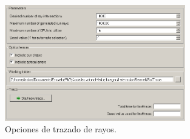 \documentclass[12pt, spanish]{article}
\theoremstyle{problemstyle}
\begin{document}
\begin{figure}[h!]
  \centering
  \includegraphics[width=0.7\textwidth]{figures/raytrace}
  \caption{\label{fig:trazado} Opciones de trazado de rayos.}
\end{figure}









\end{document}
